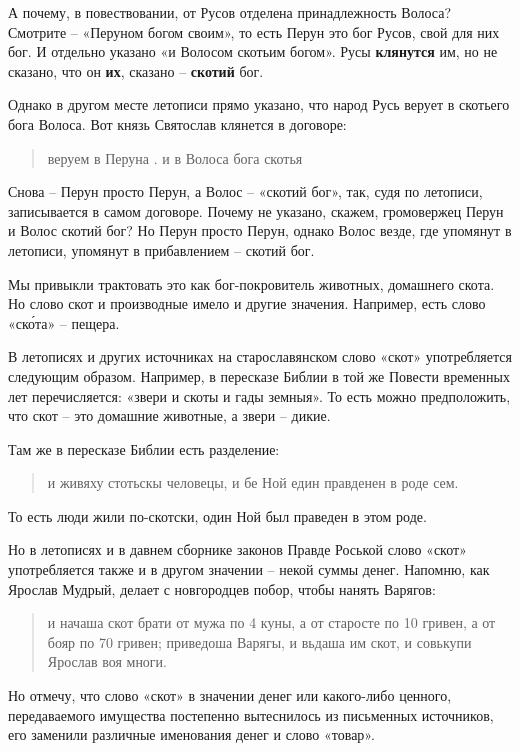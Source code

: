 А почему, в повествовании, от Русов отделена принадлежность Волоса? Смотрите – «Перуном богом своим», то есть Перун это бог Русов, свой для них бог. И отдельно указано «и Волосом скотьим богом». Русы \textbf{клянутся} им, но не сказано, что он \textbf{их}, сказано – \textbf{скотий} бог.

Однако в другом месте летописи прямо указано, что народ Русь верует в скотьего бога Волоса. Вот князь Святослав клянется в договоре:

\begin{quotation}
веруем в Перуна . и в Волоса бога скотья
\end{quotation}

Снова – Перун просто Перун, а Волос – «скотий бог», так, судя по летописи, записывается в самом договоре. Почему не указано, скажем, громовержец Перун и Волос скотий бог? Но Перун просто Перун, однако Волос везде, где упомянут в летописи, упомянут в прибавлением – скотий бог.

Мы привыкли трактовать это как бог-покровитель животных, домашнего скота. Но слово скот и производные имело и другие значения. Например, есть слово «ск\'ота» – пещера.

В летописях и других источниках на старославянском слово «скот» употребляется следующим образом. Например, в пересказе Библии в той же Повести временных лет перечисляется: «звери и скоты и гады земныя». То есть можно предположить, что скот – это домашние животные, а звери – дикие.

Там же в пересказе Библии есть разделение:

\begin{quotation}
и живяху стотьскы человецы, и бе Ной един правденен в роде сем.
\end{quotation}

То есть люди жили по-скотски, один Ной был праведен в этом роде.

Но в летописях и в давнем сборнике законов Правде Роськой слово «скот» употребляется также и в другом значении – некой суммы денег. Напомню, как Ярослав Мудрый, делает с новгородцев побор, чтобы нанять Варягов:

\begin{quotation}
и начаша скот брати от мужа по 4 куны,
а от старосте по 10 гривен, а от бояр по 70
гривен; приведоша Варягы, и вьдаша им скот, и совькупи Ярослав воя многи.
\end{quotation}

Но отмечу, что слово «скот» в значении денег или какого-либо ценного, передаваемого имущества постепенно вытеснилось из письменных источников, его заменили различные именования денег и слово «товар».

